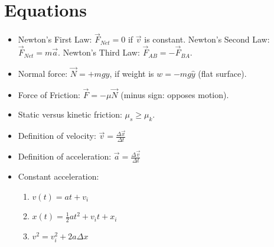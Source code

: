 \documentclass[10pt]{article}
\begin{document}
\maketitle

\section{Equations}
\begin{itemize}
\item Newton's First Law: $\vec{F}_{Net} = 0$ if $\vec{v}$ is constant.  Newton's Second Law: $\vec{F}_{Net} = m \vec{a}$. Newton's Third Law: $\vec{F}_{AB} = -\vec{F}_{BA}$.
\item Normal force: $\vec{N} = +mg\hat{y}$, if weight is $w = -mg\hat{y}$ (flat surface).
\item Force of Friction: $\vec{F} = -\mu \vec{N}$ (minus sign: opposes motion).
\item Static versus kinetic friction: $\mu_s \geq \mu_k$.
\item Definition of velocity: $\vec{v} = \frac{\Delta \vec{x}}{\Delta t}$
\item Definition of acceleration: $\vec{a} = \frac{\Delta \vec{v}}{\Delta t}$
\item Constant acceleration: 
\begin{enumerate}
\item $v(t) = at + v_i$
\item $x(t) = \frac{1}{2} a t^2 + v_i t + x_i$
\item $v^2 = v_i^2 + 2 a \Delta x$
\end{enumerate}
\end{itemize}
\end{document}

